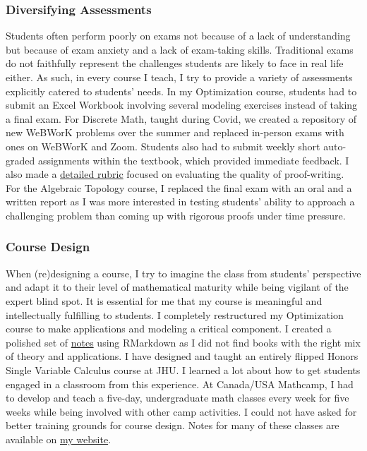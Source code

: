 \documentclass[
]{report}
\begin{document}
\hypertarget{diversifying-assessments}{%
\subsubsection*{Diversifying Assessments}\label{diversifying-assessments}}


Students often perform poorly on exams not because of a lack of understanding but because of exam anxiety and a lack of exam-taking skills. Traditional exams do not faithfully represent the challenges students are likely to face in real life either. As such, in every course I teach, I try to provide a variety of assessments explicitly catered to students' needs. In my Optimization course, students had to submit an Excel Workbook involving several modeling exercises instead of taking a final exam. For Discrete Math, taught during Covid, we created a repository of new WeBWorK problems over the summer and replaced in-person exams with ones on WeBWorK and Zoom. Students also had to submit weekly short auto-graded assignments within the textbook, which provided immediate feedback. I also made a \protect\hyperlink{rubric-for-grading-proofs-for-discrete-math-course}{detailed rubric} focused on evaluating the quality of proof-writing. For the Algebraic Topology course, I replaced the final exam with an oral and a written report as I was more interested in testing students' ability to approach a challenging problem than coming up with rigorous proofs under time pressure.

\hypertarget{course-design}{%
\subsubsection*{Course Design}\label{course-design}}


When (re)designing a course, I try to imagine the class from students' perspective and adapt it to their level of mathematical maturity while being vigilant of the expert blind spot. It is essential for me that my course is meaningful and intellectually fulfilling to students. I completely restructured my Optimization course to make applications and modeling a critical component. I created a polished set of \href{https://apurvanakade.github.io/Introduction-to-Optimization/}{notes} using RMarkdown as I did not find books with the right mix of theory and applications. I have designed and taught an entirely flipped Honors Single Variable Calculus course at JHU. I learned a lot about how to get students engaged in a classroom from this experience.
At Canada/USA Mathcamp, I had to develop and teach a five-day, undergraduate math classes every week for five weeks while being involved with other camp activities.
I could not have asked for better training grounds for course design.
Notes for many of these classes are available on \href{https://apurvanakade.github.io/math-notes.html}{my website}.
\end{document}

